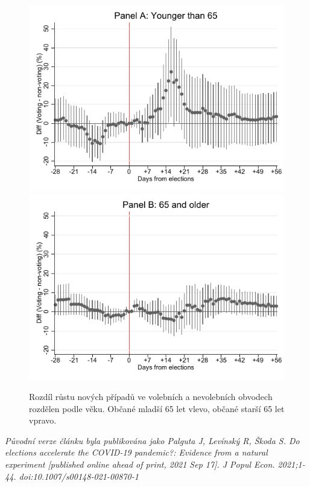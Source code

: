   
\begin{figure}[ht]
    \centering
    \includegraphics[scale=0.58]{Covid+_growth_rate14_less65.pdf} 
    \includegraphics[scale=0.58]{Covid+_growth_rate14_older65.pdf} 
    \caption{Rozdíl růstu nových případů ve volebních a nevolebních obvodech rozdělen podle věku. Občané mladší 65 let vlevo, občané starší 65 let vpravo.}
 \label{fig:heterogen_age}
\end{figure}

\it
Původní verze článku byla publikována jako
Palguta J, Levínský R, Škoda S. Do elections accelerate the COVID-19 pandemic?: Evidence from a natural experiment [published online ahead of print, 2021 Sep 17]. J Popul Econ. 2021;1-44. doi:10.1007/s00148-021-00870-1
